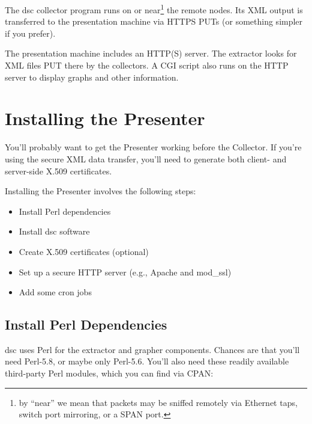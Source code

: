 \documentclass{report}
\def\dsc{{\sc dsc}}
\begin{document}
The {\dsc} collector program runs on or near\footnote{by
``near'' we mean that packets may be sniffed remotely via Ethernet taps, switch
port mirroring, or a SPAN port.} the remote nodes.  Its XML output
is transferred to the presentation machine via HTTPS PUTs (or something simpler
if you prefer).

The presentation machine includes an HTTP(S) server.  The extractor looks
for XML files PUT there by the collectors.  A CGI script also runs on
the HTTP server to display graphs and other information.



\chapter{Installing the Presenter}

You'll probably want to get the Presenter working before the Collector.
If you're using the secure XML data transfer, you'll need to
generate both client- and server-side X.509 certificates.

Installing the Presenter involves the following steps:
\begin{itemize}
\setlength{\itemsep}{0ex plus 0.5ex minus 0.0ex}
\item
	Install Perl dependencies
\item
	Install {\dsc} software
\item
	Create X.509 certificates (optional)
\item
	Set up a secure HTTP server (e.g., Apache and mod\_ssl)
\item
	Add some cron jobs
\end{itemize}


\section{Install Perl Dependencies}

{\dsc} uses Perl for the extractor and grapher components.  Chances are
that you'll need Perl-5.8, or maybe only Perl-5.6.  You'll also need
these readily available third-party Perl modules, which you
can find via CPAN:
\end{document}
